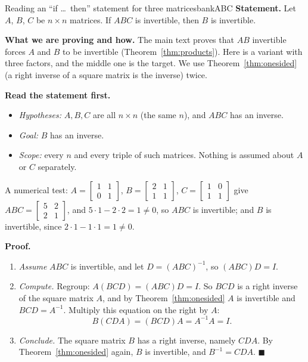 \documentclass[11pt]{article}
\begin{document}
\begin{exmp}{Reading an ``if \dots\ then'' statement for three matrices}{bankABC}
\textbf{Statement.} Let $A$, $B$, $C$ be $n\times n$ matrices. If $ABC$ is invertible, then $B$ is invertible.

\textbf{What we are proving and how.} The main text proves that $AB$ invertible forces $A$ and $B$ to be invertible (Theorem~\ref{thm:products}). Here is a variant with three factors, and the middle one is the target. We use Theorem~\ref{thm:onesided} (a right inverse of a square matrix is the inverse) twice.

\textbf{Read the statement first.}
\begin{itemize}
  \item \emph{Hypotheses:} $A,B,C$ are all $n\times n$ (the same $n$), and $ABC$ has an inverse.
  \item \emph{Goal:} $B$ has an inverse.
  \item \emph{Scope:} every $n$ and every triple of such matrices. Nothing is assumed about $A$ or $C$ separately.
\end{itemize}
A numerical test: $A=\begin{bmatrix}1&1\\0&1\end{bmatrix}$, $B=\begin{bmatrix}2&1\\1&1\end{bmatrix}$, $C=\begin{bmatrix}1&0\\1&1\end{bmatrix}$ give $ABC=\begin{bmatrix}5&2\\2&1\end{bmatrix}$, and $5\cdot1-2\cdot2=1\neq0$, so $ABC$ is invertible; and $B$ is invertible, since $2\cdot1-1\cdot1=1\neq0$.

\textbf{Proof.}
\begin{enumerate}[itemsep=2pt]
  \item \emph{Assume} $ABC$ is invertible, and let $D=(ABC)^{-1}$, so $(ABC)D=I$.
  \item \emph{Compute.} Regroup: $A(BCD)=(ABC)D=I$. So $BCD$ is a right inverse of the square matrix $A$, and by Theorem~\ref{thm:onesided} $A$ is invertible and $BCD=A^{-1}$. Multiply this equation on the right by $A$:
  \[
  B(CDA)=(BCD)A=A^{-1}A=I.
  \]
  \item \emph{Conclude.} The square matrix $B$ has a right inverse, namely $CDA$. By Theorem~\ref{thm:onesided} again, $B$ is invertible, and $B^{-1}=CDA$. \qquad$\blacksquare$
\end{enumerate}


\end{exmp}
\end{document}
